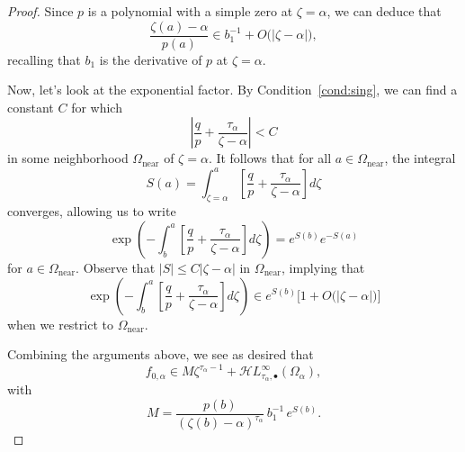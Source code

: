 \documentclass{article}
\theoremstyle{plain}
\newcommand{\singexp}[2]{\mathcal{H}L^\infty_{#1, #2}}
\newcommand{\singexpalg}[1]{\singexp{#1}{\bullet}}
\newcommand{\domain}{\Omega}
\begin{document}
\begin{proof}
Since $p$ is a polynomial with a simple zero at $\zeta = \alpha$, we can deduce that
\[ \frac{\zeta(a)-\alpha}{p(a)} \in b_1^{-1} + O\big(|\zeta - \alpha|\big), \]
recalling that $b_1$ is the derivative of $p$ at $\zeta = \alpha$.

Now, let's look at the exponential factor. By Condition~\eqref{cond:sing}, we can find a constant $C$ for which
\[ \left| \frac{q}{p}+\frac{\tau_\alpha}{\zeta-\alpha} \right| < C \]
in some neighborhood $\domain_\text{near}$ of $\zeta = \alpha$. It follows that for all $a \in \domain_\text{near}$, the integral
\[ S(a) = \int_{\zeta = \alpha}^a \left[\frac{q}{p}+\frac{\tau_\alpha}{\zeta-\alpha}\right] d\zeta \]
converges, allowing us to write
\[ \exp\left(-\int_b^a\left[\frac{q}{p}+\frac{\tau_\alpha}{\zeta-\alpha}\right] d\zeta\right) = e^{S(b)} e^{-S(a)} \]
for $a \in \domain_\text{near}$. Observe that $|S| \le C |\zeta - \alpha|$ in $\domain_\text{near}$, implying that
\[ \exp\left(-\int_b^a\left[\frac{q}{p}+\frac{\tau_\alpha}{\zeta-\alpha}\right] d\zeta\right) \in e^{S(b)} \Big[1 + O\big(|\zeta - \alpha|\big) \Big] \]
when we restrict to $\domain_\text{near}$.

Combining the arguments above, we see as desired that
\[ f_{0, \alpha} \in M\zeta^{\tau_\alpha - 1} + \singexpalg{\tau_\alpha}(\domain_\alpha), \]
with
\[ M = \frac{p(b)}{(\zeta(b)-\alpha)^{\tau_\alpha}}\,b_1^{-1}\,e^{S(b)}. \]

\color{black}
\end{proof}





\end{document}
